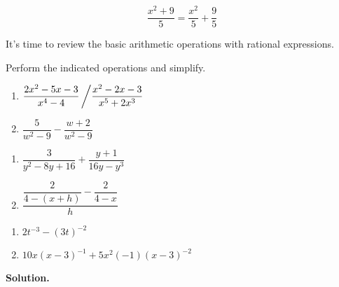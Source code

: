 \documentclass[10pt]{article}
\begin{document}
\[ \dfrac{x^2+9}{5} = \dfrac{x^2}{5} + \dfrac{9}{5} \] 

It's time to review the basic arithmetic operations with rational expressions. 

\pagebreak

\begin{ex} \label{rationalexpressionreviewex} Perform the indicated operations and simplify.

\begin{multicols}{2}
\begin{enumerate}

\item  $\dfrac{2x^2-5x-3}{x^4 - 4} \left/ \dfrac{x^2-2x-3}{x^5 + 2x^3}\right.$

\item  $\dfrac{5}{w^2 - 9} - \dfrac{w+2}{w^2-9}$

\setcounter{HW}{\value{enumi}}
\end{enumerate}

\end{multicols}

\begin{multicols}{2}
\begin{enumerate}
\setcounter{enumi}{\value{HW}}

\item  $\dfrac{3}{y^2 - 8y + 16} + \dfrac{y+1}{16y - y^3}$

\item  $\dfrac{\dfrac{2}{4 - (x+h)} - \dfrac{2}{4-x}}{h}$

\setcounter{HW}{\value{enumi}}
\end{enumerate}

\end{multicols}


\begin{enumerate}
\setcounter{enumi}{\value{HW}}

\item  $2t^{-3} - (3t)^{-2}$

\item  $10x(x-3)^{-1} + 5x^2(-1)(x-3)^{-2}$

\setcounter{HW}{\value{enumi}}
\end{enumerate}


{\bf Solution.}

\begin{enumerate}


\end{enumerate}
\end{ex}
\end{document}

